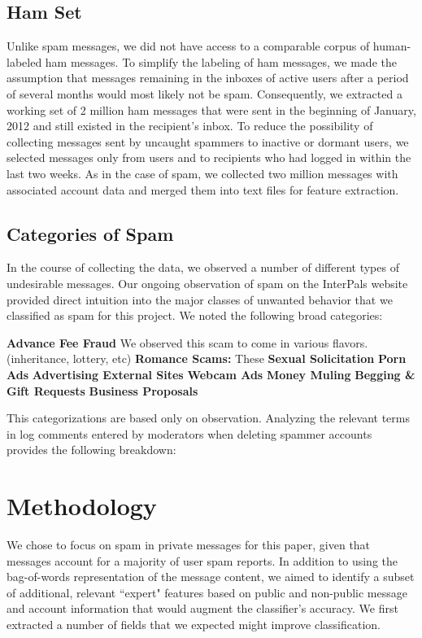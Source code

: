 \documentclass[preprint]{acm_proc_article-sp}
\begin{document}
\subsection{Ham Set}

Unlike spam messages, we did not have access to a comparable corpus of human-labeled ham messages. To simplify the labeling of ham messages, we made the assumption that messages remaining in the inboxes of active users after a period of several months would most likely not be spam. Consequently, we extracted a working set of 2 million ham messages that were sent in the beginning of January, 2012 and still existed in the recipient's inbox. To reduce the possibility of collecting messages sent by uncaught spammers to inactive or dormant users, we selected messages only from users and to recipients who had logged in within the last two weeks. As in the case of spam, we collected two million messages with associated account data and merged them into text files for feature extraction.

\subsection{Categories of Spam}

In the course of collecting the data, we observed a number of different types of undesirable messages. Our ongoing observation of spam on the InterPals website provided direct intuition into the major classes of unwanted behavior that we classified as spam for this project. We noted the following broad categories:

\textbf{Advance Fee Fraud} We observed this scam to come in various flavors.  (inheritance, lottery,  etc)
\textbf{Romance Scams:} These 
\textbf{Sexual Solicitation}
\textbf{Porn Ads}
\textbf{Advertising External Sites}
\textbf{Webcam Ads}
\textbf{Money Muling}
\textbf{Begging \& Gift Requests}
\textbf{Business Proposals}


This categorizations are based only on observation. Analyzing the relevant terms in log comments entered by moderators when deleting spammer accounts provides the following breakdown:


\section{Methodology}

We chose to focus on spam in private messages for this paper, given that messages account for 
a majority of user spam reports. In addition to using the bag-of-words representation of 
the message content, we aimed to identify a subset of additional, relevant ``expert" features 
based on public and non-public message and account information that would augment the classifier's 
accuracy. We first extracted a number of fields that we expected might improve classification. 
\end{document}
